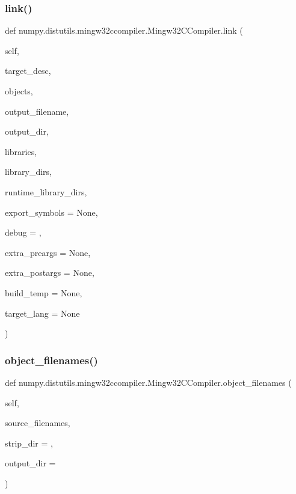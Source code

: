 \subsubsection{\texorpdfstring{link()}{link()}}
{\footnotesize\ttfamily def numpy.\+distutils.\+mingw32ccompiler.\+Mingw32\+C\+Compiler.\+link (\begin{DoxyParamCaption}\item[{}]{self,  }\item[{}]{target\+\_\+desc,  }\item[{}]{objects,  }\item[{}]{output\+\_\+filename,  }\item[{}]{output\+\_\+dir,  }\item[{}]{libraries,  }\item[{}]{library\+\_\+dirs,  }\item[{}]{runtime\+\_\+library\+\_\+dirs,  }\item[{}]{export\+\_\+symbols = {\ttfamily None},  }\item[{}]{debug = {},  }\item[{}]{extra\+\_\+preargs = {\ttfamily None},  }\item[{}]{extra\+\_\+postargs = {\ttfamily None},  }\item[{}]{build\+\_\+temp = {\ttfamily None},  }\item[{}]{target\+\_\+lang = {\ttfamily None} }\end{DoxyParamCaption})}

\mbox{\label{classnumpy_1_1distutils_1_1mingw32ccompiler_1_1Mingw32CCompiler_a585fb70fc54fd442bb0e5475ee75ae75}} 
\subsubsection{\texorpdfstring{object\+\_\+filenames()}{object\_filenames()}}
{\footnotesize\ttfamily def numpy.\+distutils.\+mingw32ccompiler.\+Mingw32\+C\+Compiler.\+object\+\_\+filenames (\begin{DoxyParamCaption}\item[{}]{self,  }\item[{}]{source\+\_\+filenames,  }\item[{}]{strip\+\_\+dir = {},  }\item[{}]{output\+\_\+dir = {\ttfamily \textquotesingle{}\textquotesingle{}} }\end{DoxyParamCaption})}



